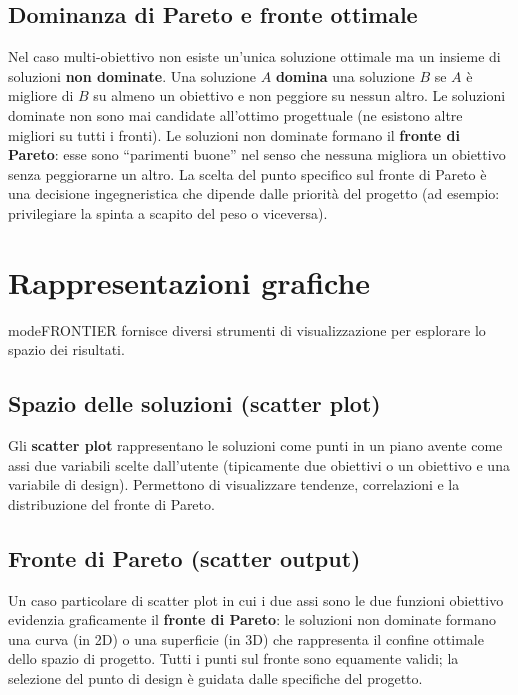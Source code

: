 \subsection{Dominanza di Pareto e fronte ottimale}

Nel caso multi-obiettivo non esiste un'unica soluzione ottimale ma un
insieme di soluzioni \textbf{non dominate}.
Una soluzione $A$ \textbf{domina} una soluzione $B$ se $A$ è migliore
di $B$ su almeno un obiettivo e non peggiore su nessun altro.
Le soluzioni dominate non sono mai candidate all'ottimo progettuale
(ne esistono altre migliori su tutti i fronti).
Le soluzioni non dominate formano il \textbf{fronte di Pareto}: esse
sono ``parimenti buone'' nel senso che nessuna migliora un obiettivo
senza peggiorarne un altro.
La scelta del punto specifico sul fronte di Pareto è una decisione
ingegneristica che dipende dalle priorità del progetto
(ad esempio: privilegiare la spinta a scapito del peso o viceversa).

\section{Rappresentazioni grafiche}
\label{sec:grafici}

modeFRONTIER fornisce diversi strumenti di visualizzazione per
esplorare lo spazio dei risultati.

\subsection{Spazio delle soluzioni (scatter plot)}

Gli \textbf{scatter plot} rappresentano le soluzioni come punti in un
piano avente come assi due variabili scelte dall'utente (tipicamente
due obiettivi o un obiettivo e una variabile di design).
Permettono di visualizzare tendenze, correlazioni e la distribuzione
del fronte di Pareto.

\subsection{Fronte di Pareto (scatter output)}

Un caso particolare di scatter plot in cui i due assi sono le due
funzioni obiettivo evidenzia graficamente il \textbf{fronte di Pareto}:
le soluzioni non dominate formano una curva (in 2D) o una superficie
(in 3D) che rappresenta il confine ottimale dello spazio di progetto.
Tutti i punti sul fronte sono equamente validi; la selezione del punto
di design è guidata dalle specifiche del progetto.

